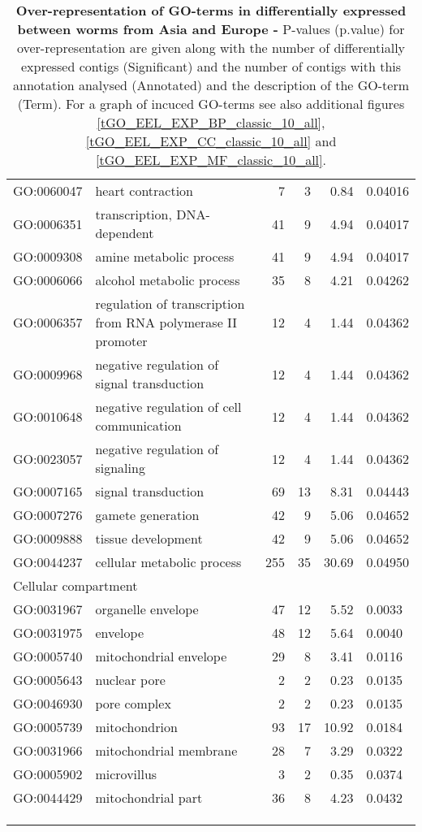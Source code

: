 \begin{longtable}{lp{4.5cm}rrrl}
  GO:0060047 & heart contraction &   7 &   3 & 0.84 & 0.04016 \\ 
  GO:0006351 & transcription, DNA-dependent &  41 &   9 & 4.94 & 0.04017 \\ 
  GO:0009308 & amine metabolic process &  41 &   9 & 4.94 & 0.04017 \\ 
  GO:0006066 & alcohol metabolic process &  35 &   8 & 4.21 & 0.04262 \\ 
  GO:0006357 & regulation of transcription from RNA polymerase II promoter &  12 &   4 & 1.44 & 0.04362 \\ 
  GO:0009968 & negative regulation of signal transduction &  12 &   4 & 1.44 & 0.04362 \\ 
  GO:0010648 & negative regulation of cell communication &  12 &   4 & 1.44 & 0.04362 \\ 
  GO:0023057 & negative regulation of signaling &  12 &   4 & 1.44 & 0.04362 \\ 
  GO:0007165 & signal transduction &  69 &  13 & 8.31 & 0.04443 \\ 
  GO:0007276 & gamete generation &  42 &   9 & 5.06 & 0.04652 \\ 
  GO:0009888 & tissue development &  42 &   9 & 5.06 & 0.04652 \\ 
  GO:0044237 & cellular metabolic process & 255 &  35 & 30.69 & 0.04950 \\ 
   \hline
   \multicolumn{6}{l}{Cellular compartment}  \\ 
GO:0031967 & organelle envelope &  47 &  12 & 5.52 & 0.0033 \\ 
  GO:0031975 & envelope &  48 &  12 & 5.64 & 0.0040 \\ 
  GO:0005740 & mitochondrial envelope &  29 &   8 & 3.41 & 0.0116 \\ 
  GO:0005643 & nuclear pore &   2 &   2 & 0.23 & 0.0135 \\ 
  GO:0046930 & pore complex &   2 &   2 & 0.23 & 0.0135 \\ 
  GO:0005739 & mitochondrion &  93 &  17 & 10.92 & 0.0184 \\ 
  GO:0031966 & mitochondrial membrane &  28 &   7 & 3.29 & 0.0322 \\ 
  GO:0005902 & microvillus &   3 &   2 & 0.35 & 0.0374 \\ 
  GO:0044429 & mitochondrial part &  36 &   8 & 4.23 & 0.0432 \\ 
   \hline\\
   \caption[Over-representation of GO-terms in differentially
   expressed between worms from Asia and Europe
   ]{\textbf{Over-representation of GO-terms in differentially
       expressed between worms from Asia and Europe -} P-values
     (p.value) for over-representation are given along with the number
     of differentially expressed contigs (Significant) and the number
     of contigs with this annotation analysed (Annotated) and the
     description of the GO-term (Term). For a graph of incuced
     GO-terms see also additional figures
     \ref{tGO_EEL_EXP_BP_classic_10_all},
     \ref{tGO_EEL_EXP_CC_classic_10_all} and
     \ref{tGO_EEL_EXP_MF_classic_10_all}.}\\
   \label{over-de-ae-454}
\end{longtable}

